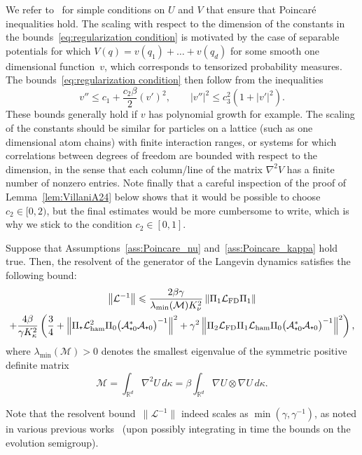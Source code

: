 \documentclass[AHL,Unicode,longabstracts,MathTools,published]{cedram}
\newcommand{\cL}{\mathcal{L}}
\newcommand{\cLa}{\mathcal{A}}
\newcommand{\cLM}{\mathcal{M}}
\newcommand{\R}{\mathbb{R}}
\newcommand{\cLham}{\mathcal{L}_{\rm ham}}
\newcommand{\cLFD}{\mathcal{L}_{\rm FD}}
\newcommand{\subplus}{\textnormal{\texttt{+}}}
\renewcommand{\leq}{\leqslant}
\begin{document}
We refer to~\cite{BBCG} for simple conditions on $U$ and $V$ that ensure that Poincaré inequalities hold. The scaling with respect to the dimension of the constants in the bounds~\eqref{eq:regularization condition} is motivated by the case of separable potentials for which $V(q) = v(q_1) + \dots + v(q_d)$ for some smooth one dimensional function~$v$, which corresponds to tensorized probability measures. The bounds~\eqref{eq:regularization condition} then follow from the inequalities
\[
v'' \leq c_1 + \frac{c_2 \beta}{2} (v')^2, \qquad \left|v''\right|^2 \leq c_3^2 \left(1+\left|v'\right|^2 \right).
\]
These bounds generally hold if $v$ has polynomial growth for example. The scaling of the constants should be similar for particles on a lattice (such as one dimensional atom chains) with finite interaction ranges, or systems for which correlations between degrees of freedom are bounded with respect to the dimension, in the sense that each column/line of the matrix $\nabla^2 V$ has a finite number of nonzero entries. Note finally that a careful inspection of the proof of Lemma~\ref{lem:VillaniA24} below shows that it would be possible to choose $c_2 \in [0,2)$, but the final estimates would be more cumbersome to write, which is why we stick to the condition $c_2 \in [0,1]$.

\begin{theo}
Suppose that Assumptions~\ref{ass:Poincare_nu} and~\ref{ass:Poincare_kappa} hold true. Then, the resolvent of the generator of the Langevin dynamics satisfies the following bound:
\begin{multline}\label{eq:bounds_invL_Langevin}
\left\|\cL^{-1}\right\| \leq \frac{2\beta\gamma}{\lambda_{\min}(\cLM) K_\nu^2} \left\|\Pi_1 \cLFD \Pi_1\right\| \\
+ \frac{4\beta}{\gamma K_\kappa^2} \left(\frac34 + \left\| \Pi_\subplus \cLham^2 \Pi_0 \big(\cLa_{\subplus 0}^*\cLa_{\subplus 0}\big)^{-1} \right\|^2 + \gamma^2 \left\| \Pi_2 \cLFD \Pi_1 \cLham \Pi_0 \big(\cLa_{\subplus 0}^*\cLa_{\subplus 0}\big)^{-1} \right\|^2 \right),
\end{multline}
where $\lambda_{\min}(\cLM) > 0$ denotes the smallest eigenvalue of the symmetric positive definite matrix
\[
\cLM = \int_{\R^d} \nabla^2 U \, d\kappa = \beta \int_{\R^d} \nabla U \otimes \nabla U \, d\kappa.
\]
\end{theo}

Note that the resolvent bound~$\|\cL^{-1}\|$ indeed scales as $ \min(\gamma,\gamma^{-1})$, as noted in various previous works~\cite{DKMS13,GS16,IOS19} (upon possibly integrating in time the bounds on the evolution semigroup).
\end{document}
